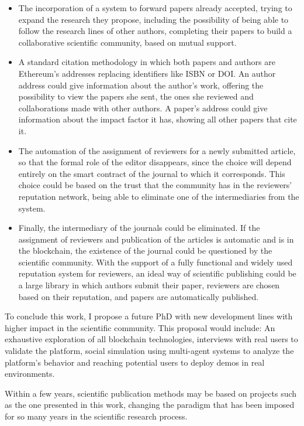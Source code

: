 \begin{itemize}
\item The incorporation of a system to forward papers already accepted, trying
  to expand the research they propose, including the possibility of being able
  to follow the research lines of other authors, completing their papers to
  build a collaborative scientific community, based on mutual support.
\item A standard citation methodology in which both papers and authors are
  Ethereum's addresses replacing identifiers like ISBN or DOI. An author address
  could give information about the author's work, offering the possibility to
  view the papers she sent, the ones she reviewed and collaborations made with
  other authors. A paper's address could give information about the impact
  factor it has, showing all other papers that cite it.
\item The automation of the assignment of reviewers for a newly submitted
  article, so that the formal role of the editor disappears, since the choice
  will depend entirely on the smart contract of the journal to which it
  corresponds. This choice could be based on the trust that the community has in
  the reviewers' reputation network, being able to eliminate one of the
  intermediaries from the system.
\item Finally, the intermediary of the journals could be eliminated. If the
  assignment of reviewers and publication of the articles is automatic and is in
  the blockchain, the existence of the journal could be questioned by the
  scientific community. With the support of a fully functional and widely used
  reputation system for reviewers, an ideal way of scientific publishing could
  be a large library in which authors submit their paper, reviewers are chosen based on their reputation, and papers are automatically published.
\end{itemize}

To conclude this work, I propose a future PhD with new development lines with
higher impact in the scientific community. This proposal would include: An
exhaustive exploration of all blockchain technologies, interviews with real
users to validate the platform, social simulation using multi-agent systems to
analyze the platform's behavior and reaching potential users to deploy demos in
real environments.

Within a few years, scientific publication methods may be based on projects such
as the one presented in this work, changing the paradigm that has been imposed
for so many years in the scientific research process.

